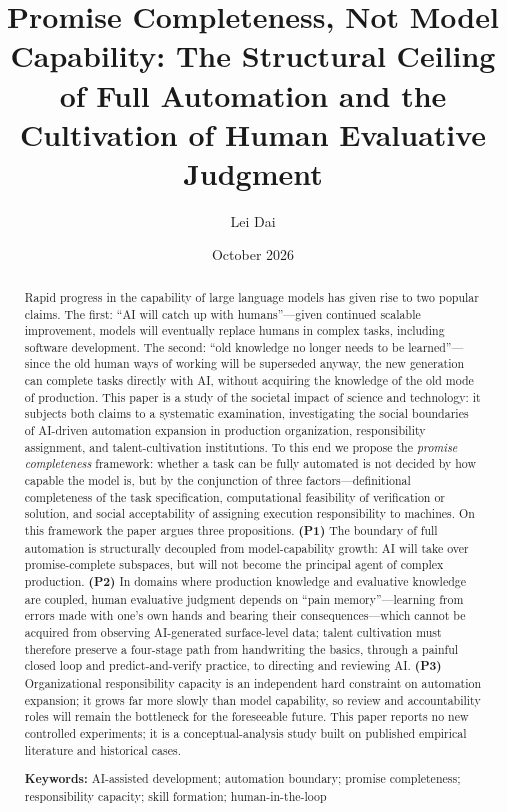 \documentclass[11pt]{article}
\title{Promise Completeness, Not Model Capability: The Structural Ceiling
of Full Automation and the Cultivation of Human Evaluative Judgment}
\author{Lei Dai}
\date{October 2026}
\begin{document}
\maketitle

\begin{abstract}
Rapid progress in the capability of large language models has given rise to
two popular claims. The first: ``AI will catch up with humans''---given
continued scalable improvement, models will eventually replace humans in
complex tasks, including software development. The second: ``old knowledge
no longer needs to be learned''---since the old human ways of working will
be superseded anyway, the new generation can complete tasks directly with
AI, without acquiring the knowledge of the old mode of production. This
paper is a study of the societal impact of science and technology: it
subjects both claims to a systematic examination, investigating the social
boundaries of AI-driven automation expansion in production organization,
responsibility assignment, and talent-cultivation institutions. To this end
we propose the \emph{promise completeness} framework: whether a task can be
fully automated is not decided by how capable the model is, but by the
conjunction of three factors---definitional completeness of the task
specification, computational feasibility of verification or solution, and
social acceptability of assigning execution responsibility to machines. On
this framework the paper argues three propositions. \textbf{(P1)} The
boundary of full automation is structurally decoupled from model-capability
growth: AI will take over promise-complete subspaces, but will not become
the principal agent of complex production. \textbf{(P2)} In domains where
production knowledge and evaluative knowledge are coupled, human evaluative
judgment depends on ``pain memory''---learning from errors made with
one's own hands and bearing their consequences---which cannot be acquired
from observing AI-generated surface-level data; talent cultivation must
therefore preserve a four-stage path from handwriting the basics, through a
painful closed loop and predict-and-verify practice, to directing and
reviewing AI. \textbf{(P3)} Organizational responsibility capacity is an
independent hard constraint on automation expansion; it grows far more
slowly than model capability, so review and accountability roles will
remain the bottleneck for the foreseeable future. This paper reports no new
controlled experiments; it is a conceptual-analysis study built on published
empirical literature and historical cases.

\medskip
\noindent\textbf{Keywords:} AI-assisted development; automation boundary;
promise completeness; responsibility capacity; skill formation;
human-in-the-loop
\end{abstract}
\end{document}
